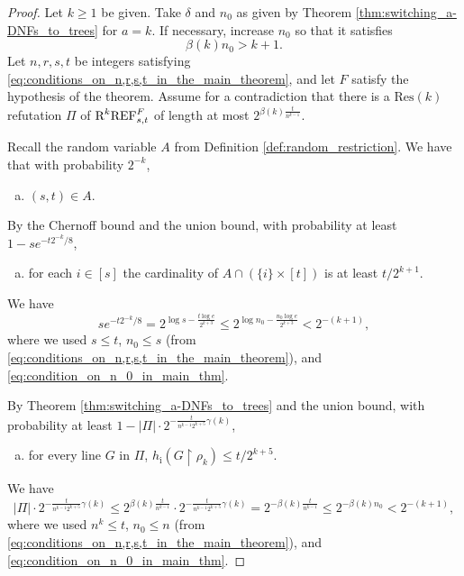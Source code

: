 \begin{proof}
Let $k \geq 1$ be given. Take $\delta$ and $n_0$ as given by Theorem \ref{thm:switching_a-DNFs_to_trees} for $a=k$. If necessary, increase $n_0$ so that it satisfies 
\begin{equation}
\label{eq:condition_on_n_0_in_main_thm}
\beta(k) n_0 > k + 1.
\end{equation}
Let $n,r,s,t$ be integers satisfying \eqref{eq:conditions_on_n,r,s,t_in_the_main_theorem}, and let $F$ satisfy the hypothesis of the theorem. 
Assume for a contradiction that there is a $\text{Res}(k)$ refutation $\Pi$ of $\textnormal{R}^k\textnormal{REF}^{F}_{s,t}$ of length at most $2^{\beta(k) \frac{t}{n^{k-1}}}$. 

Recall the random variable $A$ from Definition \ref{def:random_restriction}. We have that with probability  $2^{-k}$, 
\begin{enumerate}[(a)]
\item \label{item:s,t_in_A-in_main_theorem} $(s,t) \in A$.
\end{enumerate}

By the Chernoff bound and the union bound, with probability at least $1 - se^{- t2^{-k} / 8} $, 
\begin{enumerate}[(b)]
\item \label{item:A_widely_intersects_levels-in_main_thereom} for each $i \in [s]$ the cardinality of $A \cap (\{i\} \times [t])$ is at least $t/2^{k+1}$. 
\end{enumerate}
We have 
\begin{equation*}
se^{- t2^{-k} / 8} = 2^{\log s - \frac{t \log e}{2^{k+3}}} \leq 2^{\log n_0 - \frac{n_0 \log e}{2^{k+3}}}  < 2^{-(k+1)},
\end{equation*}
where we used $s \leq t$, $n_0 \leq s$ (from \eqref{eq:conditions_on_n,r,s,t_in_the_main_theorem}), and \eqref{eq:condition_on_n_0_in_main_thm}.

By Theorem \ref{thm:switching_a-DNFs_to_trees} and the union bound, with probability at least $1 - |\Pi| \cdot 2^{- \frac{t}{n^{k-1}2^{k+5}} \gamma(k)}$, 
\begin{enumerate}[(c)]
\item \label{item:all_lines_to_trees-in_main_theorem} for every line $G$ in $\Pi$, $h_{\text{i}}(G \! \restriction \! \rho_k) \leq t/2^{k+5}$. 
\end{enumerate}
We have 
\begin{equation*}
 |\Pi| \cdot 2^{- \frac{t}{n^{k-1}2^{k+5}}\gamma(k)} 
 \leq 2^{\beta(k) \frac{t}{n^{k-1}}} \cdot 2^{- \frac{t}{n^{k-1}2^{k+5}} \gamma(k)} 
 = 2^{ - \beta(k) \frac{t}{n^{k-1}}} 
\leq 2^{ - \beta(k) n_0} < 2^{-(k+1)},
\end{equation*}
where we used $n^k \leq t$, $n_0 \leq n$ (from \eqref{eq:conditions_on_n,r,s,t_in_the_main_theorem}), and \eqref{eq:condition_on_n_0_in_main_thm}.


\end{proof}
